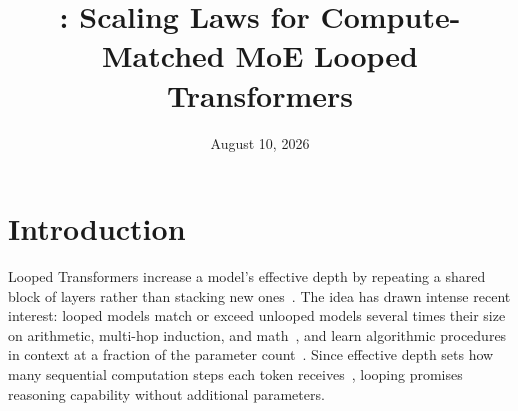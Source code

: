 \documentclass[]{bytedance_seed}
\title{\archname: Scaling Laws for Compute-Matched MoE Looped Transformers}
\affiliation[1]{Tsinghua University}
\affiliation[2]{ByteDance Seed}
\affiliation[3]{M-A-P}
\affiliation[4]{TokenWave.AI}
\date{August 10, 2026}
\theoremstyle{definition}
\theoremstyle{remark}
\begin{document}
\maketitle

%
\section{Introduction}
\label{sec:introduction}

%
%
Looped Transformers increase a model's effective depth by repeating a shared block of layers rather than stacking new ones~\cite{dehghani2019universal}.
%
The idea has drawn intense recent interest: looped models match or exceed unlooped models several times their size on arithmetic, multi-hop induction, and math~\cite{geiping2025scaling,saunshi2025reasoning,zhu2025scaling}, and learn algorithmic procedures in context at a fraction of the parameter count~\cite{yang2024looped}.
%
Since effective depth sets how many sequential computation steps each token receives~\cite{li2024serial,merrill2023parallelism}, looping promises reasoning capability without additional parameters.
\end{document}
